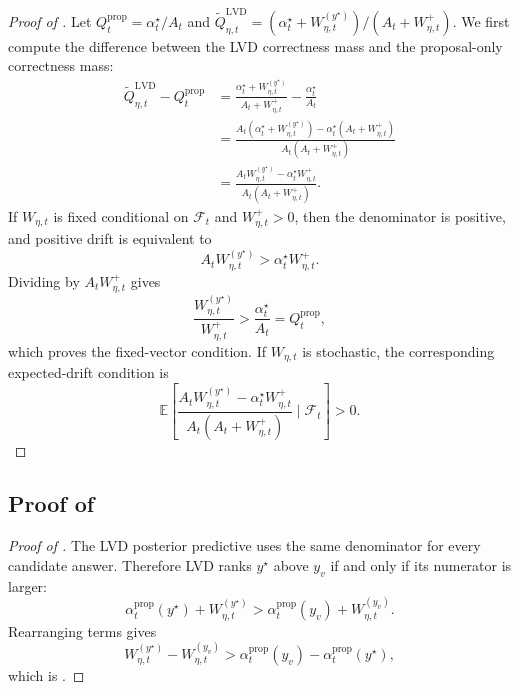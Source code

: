 \begin{proof}[Proof of ]
Let
$Q_t^{\mathrm{prop}}=\alpha_t^\star/A_t$ and
$\widetilde Q_{\eta,t}^{\mathrm{LVD}}=
(\alpha_t^\star+W_{\eta,t}^{(y^\star)})/(A_t+W_{\eta,t}^+)$.
We first compute the difference between the LVD correctness mass and the
proposal-only correctness mass:
\[
\begin{aligned}
    \widetilde Q_{\eta,t}^{\mathrm{LVD}}-Q_t^{\mathrm{prop}}
    &=
    \frac{\alpha_t^\star+W_{\eta,t}^{(y^\star)}}{A_t+W_{\eta,t}^+}
    -
    \frac{\alpha_t^\star}{A_t}\\
    &=
    \frac{
    A_t(\alpha_t^\star+W_{\eta,t}^{(y^\star)})
    -
    \alpha_t^\star(A_t+W_{\eta,t}^+)
    }{
    A_t(A_t+W_{\eta,t}^+)
    }\\
    &=
    \frac{
    A_tW_{\eta,t}^{(y^\star)}
    -
    \alpha_t^\star W_{\eta,t}^+
    }{
    A_t(A_t+W_{\eta,t}^+)
    }.
\end{aligned}
\]
If $W_{\eta,t}$ is fixed conditional on $\mathcal F_t$ and
$W_{\eta,t}^+>0$, then the denominator is positive, and positive drift is
equivalent to
\[
    A_tW_{\eta,t}^{(y^\star)}
    >
    \alpha_t^\star W_{\eta,t}^+.
\]
Dividing by $A_tW_{\eta,t}^+$ gives
\[
    \frac{W_{\eta,t}^{(y^\star)}}{W_{\eta,t}^+}
    >
    \frac{\alpha_t^\star}{A_t}
    =
    Q_t^{\mathrm{prop}},
\]
which proves the fixed-vector condition.
If $W_{\eta,t}$ is stochastic, the corresponding expected-drift condition is
\[
    \mathbb E\!\left[
    \frac{
    A_tW_{\eta,t}^{(y^\star)}
    -
    \alpha_t^\star W_{\eta,t}^+
    }{
    A_t(A_t+W_{\eta,t}^+)
    }
    \mid
    \mathcal F_t
    \right]
    >
    0.
\]
\end{proof}

\subsection{Proof of }
\label{app:proof_correct_minority_recovery}

\begin{proof}[Proof of ]
The LVD posterior predictive uses the same denominator for every candidate
answer. Therefore LVD ranks $y^\star$ above $y_v$ if and only if its numerator
is larger:
\[
    \alpha_t^{\mathrm{prop}}(y^\star)+W_{\eta,t}^{(y^\star)}
    >
    \alpha_t^{\mathrm{prop}}(y_v)+W_{\eta,t}^{(y_v)}.
\]
Rearranging terms gives
\[
    W_{\eta,t}^{(y^\star)}-W_{\eta,t}^{(y_v)}
    >
    \alpha_t^{\mathrm{prop}}(y_v)-\alpha_t^{\mathrm{prop}}(y^\star),
\]
which is .
\end{proof}

